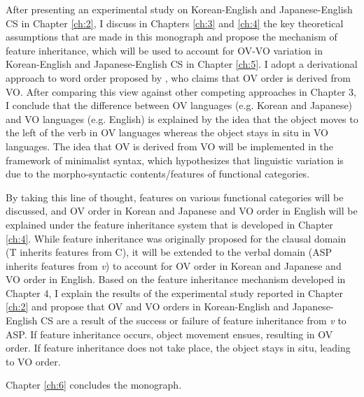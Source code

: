 After presenting an experimental study on Korean-English and Japanese-En\-glish \ac{CS} in Chapter \ref{ch:2}, I discuss in Chapters \ref{ch:3} and \ref{ch:4} the key theoretical assumptions that are made in this monograph and propose the mechanism of feature inheritance, which will be used to account for \ac{OV}-\ac{VO} variation in Korean-English and Japanese-English \ac{CS} in Chapter \ref{ch:5}. I adopt a derivational approach to word order proposed by \cite{Kayne1994}, who claims that \ac{OV} order is derived from \ac{VO}. After comparing this view against other competing approaches in Chapter 3, I conclude that the difference between \ac{OV} languages (e.g. Korean and Japanese) and \ac{VO} languages (e.g. English) is explained by the idea that the object moves to the left of the verb in \ac{OV} languages whereas the object stays in situ in \ac{VO} languages. The idea that \ac{OV} is derived from \ac{VO} will be implemented in the framework of minimalist syntax, which hypothesizes that linguistic variation is due to the morpho-syntactic contents/features of functional categories.

By taking this line of thought, features on various functional categories will be discussed, and \ac{OV} order in Korean and Japanese and \ac{VO} order in English will be explained under the feature inheritance system that is developed in Chapter \ref{ch:4}. While feature inheritance was originally proposed for the clausal domain (T inherits features from C), it will be extended to the verbal domain (\acs{ASP} inherits features from \textit{v}) to account for \ac{OV} order in Korean and Japanese and \ac{VO} order in English. Based on the feature inheritance mechanism developed in Chapter 4, I explain the results of the experimental study reported in Chapter \ref{ch:2} and propose that \ac{OV} and \ac{VO} orders in Korean-English and Japanese-English \ac{CS} are a result of the success or failure of feature inheritance from \textit{v} to \acs{ASP}. If feature inheritance occurs, object movement ensues, resulting in \ac{OV} order. If feature inheritance does not take place, the object stays in situ, leading to \ac{VO} order. 

Chapter \ref{ch:6} concludes the monograph. 
